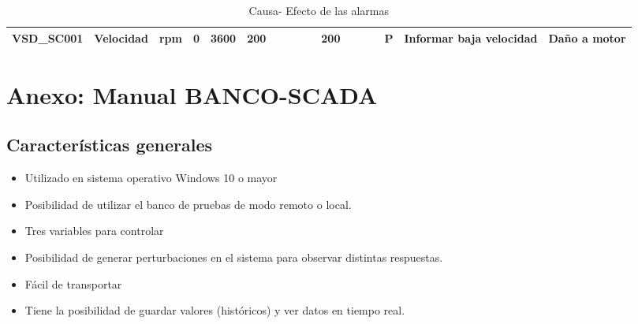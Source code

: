 \begin{table}[h!]
{{\begin{tabular}{|l|l|l|l|l|l|l|l|l|l|l|l|l|l|l|l|l|}
				\hline
				\textbf{VSD\_SC001}                                                                                               & Velocidad                                               & rpm                                                     & 0                                                               & 3600                                                            & 200                                                               &                                                                &                                                                &                                                                   &                                                                   & 200                                                               &                                                                &                                                                &                                                                   & P                                                               & Informar baja velocidad                                                                                               & Daño a motor                                                                                                                   \\
				\hline
			\end{tabular}
			
			
		}
	}
		\caption{Causa- Efecto de las alarmas}
		\label{c2_tabla_segento_tcp}
		
	\end{table}
	
	

\newpage
\section{Anexo: Manual BANCO-SCADA}
\subsection{Características generales}
\begin{itemize}
	\item Utilizado en sistema operativo Windows 10 o mayor
	\item Posibilidad de utilizar el banco de pruebas de modo remoto o local.
	\item Tres variables para controlar
\item Posibilidad de generar perturbaciones en el sistema para observar distintas respuestas.
	\item Fácil de transportar
\item Tiene la posibilidad de guardar valores (históricos) y ver datos en tiempo real.
\end{itemize}


